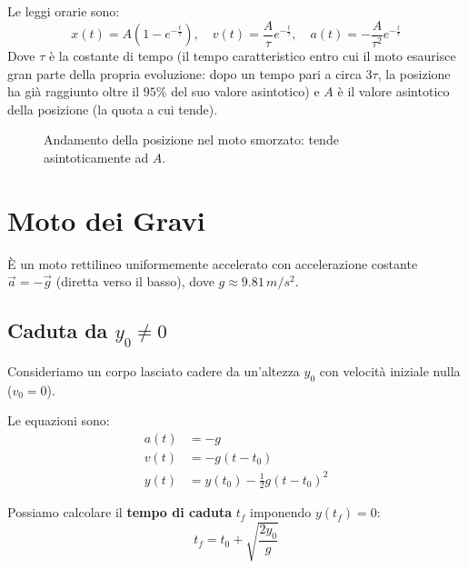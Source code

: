Le leggi orarie sono:
\begin{equation}
    x(t) = A \left(1 - e^{-\frac{t}{\tau}}\right), \quad v(t) = \frac{A}{\tau} e^{-\frac{t}{\tau}}, \quad a(t) = -\frac{A}{\tau^2} e^{-\frac{t}{\tau}}
\end{equation}
Dove $\tau$ è la costante di tempo (il tempo caratteristico entro cui il moto esaurisce gran parte della propria evoluzione: dopo un tempo pari a circa $3\tau$, la posizione ha già raggiunto oltre il $95\%$ del suo valore asintotico) e $A$ è il valore asintotico della posizione (la quota a cui tende).

\begin{figure}[h]
    \centering
    \caption{Andamento della posizione nel moto smorzato: tende asintoticamente ad $A$.}
\end{figure}

\section{Moto dei Gravi}
È un moto rettilineo uniformemente accelerato con accelerazione costante $\vec{a} = -\vec{g}$ (diretta verso il basso), dove $g \approx 9.81 \, m/s^2$.

\subsection{Caduta da \texorpdfstring{$y_0 \neq 0$}{y\_0 != 0}}
Consideriamo un corpo lasciato cadere da un'altezza $y_0$ con velocità iniziale nulla ($v_0 = 0$).

Le equazioni sono:
\begin{align*}
    a(t) &= -g \\
    v(t) &= -g(t - t_0) \\
    y(t) &= y(t_0) - \frac{1}{2}g(t - t_0)^2
\end{align*}

Possiamo calcolare il \textbf{tempo di caduta} $t_f$ imponendo $y(t_f) = 0$:
\begin{equation}
    t_f = t_0 + \sqrt{\frac{2y_0}{g}}
\end{equation}

